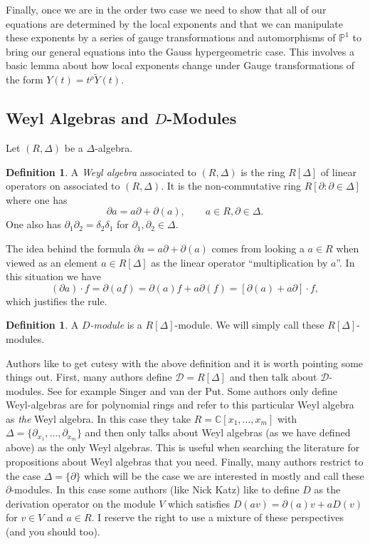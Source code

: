 \documentclass[12pt]{book}
\numberwithin{equation}{section}
\theoremstyle{definition}
\newtheorem{definition}[theorem]{Definition}
\theoremstyle{remark}
\newcommand{\CC}{\mathbb{C}}
\newcommand{\PP}{\mathbb{P}}
\begin{document}
Finally, once we are in the order two case we need to show that all of our equations are determined by the local exponents and that we can manipulate these exponents by a series of gauge transformations and automorphisms of $\PP^1$ to bring our general equations into the Gauss hypergeometric case.
This involves a basic lemma about how local exponents change under Gauge transformations of the form $Y(t) = t^{\rho} \widetilde{Y}(t)$. 

\subsection{Weyl Algebras and $D$-Modules}\label{S:weyl-algebras}

Let $(R,\Delta)$ be a $\Delta$-algebra. 
\begin{definition}
	A \emph{Weyl algebra} associated to $(R,\Delta)$ is the ring $R[\Delta]$ of linear operators on associated to $(R,\Delta)$. 
	It is the non-commutative ring $R[\partial \colon \partial \in \Delta]$ where one has
	$$ \partial a = a \partial  + \partial(a), \qquad a \in R, \partial \in \Delta.$$
	One also has $\partial_1 \partial_2 = \delta_2 \delta_1$ for $\partial_1,\partial_2 \in \Delta$.
\end{definition}

The idea behind the formula $\partial a = a \partial + \partial(a)$ comes from looking a $a \in R$ when viewed as an element $a \in R[\Delta]$ as the linear operator ``multiplication by $a$''.
In this situation we have 
$$ (\partial a) \cdot f = \partial( af) = \partial(a)f + a \partial(f) = [\partial(a) + a \partial]\cdot f,$$
which justifies the rule. 

\begin{definition}
	A \emph{$D$-module} is a $R[\Delta]$-module. 
	We will simply call these $R[\Delta]$-modules. 
\end{definition}

Authors like to get cutesy with the above definition and it is worth pointing some things out. 
First, many authors define $\mathcal{D} = R[\Delta]$ and then talk about $\mathcal{D}$-modules. See for example Singer and van der Put. 
Some authors only define Weyl-algebras are for polynomial rings and refer to this particular Weyl algebra as \emph{the} Weyl algebra. 
In this case they take $R = \CC[x_1,\ldots,x_m]$ with $\Delta = \lbrace \partial_{x_1},\ldots, \partial_{x_m} \rbrace$ and then only talks about Weyl algebras (as we have defined above) as the only Weyl algebras.
This is useful when searching the literature for propositions about Weyl algebras that you need.
Finally, many authors restrict to the case $\Delta = \lbrace \partial \rbrace$ which will be the case we are interested in mostly and call these $\partial$-modules. 
In this case some authors (like Nick Katz) like to define $D$ as the derivation operator on the module $V$ which satisfies $D(av) = \partial(a) v + a D(v)$ for $v\in V$ and $a \in R$.
I reserve the right to use a mixture of these perspectives (and you should too).
\end{document}
